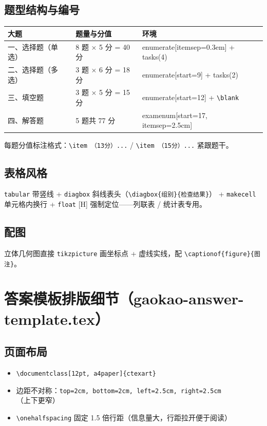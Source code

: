 \documentclass[11pt,a4paper]{ctexart}
\begin{document}
\subsection{题型结构与编号}

\begin{center}
\begin{tabular}{lll}
\toprule
大题 & 题量与分值 & 环境 \\
\midrule
一、选择题（单选） & 8 题 × 5 分 = 40 分 & enumerate[itemsep=0.3em] + tasks(4) \\
二、选择题（多选） & 3 题 × 6 分 = 18 分 & enumerate[start=9] + tasks(2) \\
三、填空题 & 3 题 × 5 分 = 15 分 & enumerate[start=12] + \texttt{\textbackslash blank} \\
四、解答题 & 5 题共 77 分 & examenum[start=17, itemsep=2.5cm] \\
\bottomrule
\end{tabular}
\end{center}

每题分值标注格式：\texttt{\textbackslash item （13分）...} / \texttt{\textbackslash item （15分）...}
紧跟题干。

\subsection{表格风格}

\texttt{tabular} 带竖线 + \texttt{diagbox} 斜线表头（\texttt{\textbackslash diagbox\{组别\}\{检查结果\}}）
+ \texttt{makecell} 单元格内换行 + \texttt{float} [H] 强制定位——列联表 / 统计表专用。

\subsection{配图}

立体几何图直接 \texttt{tikzpicture} 画坐标点 + 虚线实线，配
\texttt{\textbackslash captionof\{figure\}\{图注\}}。

\section{答案模板排版细节（gaokao-answer-template.tex）}

\subsection{页面布局}

\begin{itemize}
  \item \texttt{\textbackslash documentclass[12pt, a4paper]\{ctexart\}}
  \item 边距不对称：\texttt{top=2cm, bottom=2cm, left=2.5cm, right=2.5cm}（上下更窄）
  \item \texttt{\textbackslash onehalfspacing} 固定 1.5 倍行距（信息量大，行距拉开便于阅读）
\end{itemize}
\end{document}
